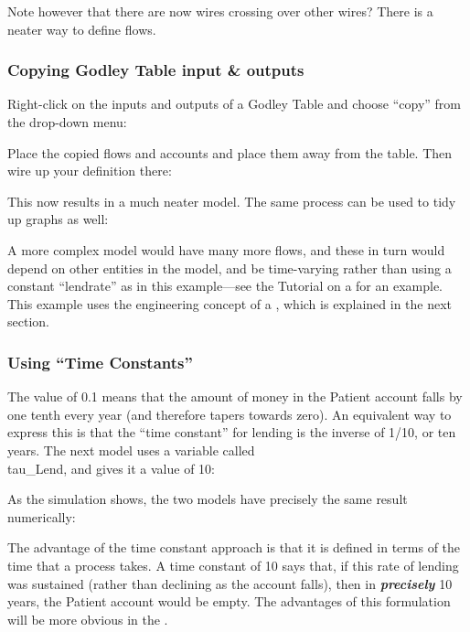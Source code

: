 Note however that there are now wires crossing over other wires? There
is a neater way to define flows. 

\subsubsection{Copying Godley Table input \& outputs}

Right-click on the inputs and outputs of a Godley Table and choose
``copy'' from the drop-down menu:



Place the copied flows and accounts and place them away from the
table. Then wire up your definition there:



This now results in a much neater model. The same process can be used
to tidy up graphs as well:



A more complex model would have many more flows, and these in turn
would depend on other entities in the model, and be time-varying
rather than using a constant ``lendrate'' as in this example---see the
Tutorial on a  for an
example. This example uses the engineering concept of a
, which is explained in the
next section. 

\subsubsection{Using ``Time Constants''}
\label{time-constants}

The value of 0.1 means that the amount of money in the Patient account
falls by one tenth every year (and therefore tapers towards zero). An
equivalent way to express this is that the ``time constant'' for
lending is the inverse of 1/10, or ten years. The next model uses a
variable called \\tau\_Lend, and gives it a value of 10: 


As the simulation shows, the two models have precisely the same result
numerically:



The advantage of the time constant approach is that it is defined in
terms of the time that a process takes. A time constant of 10 says
that, if this rate of lending was sustained (rather than declining as
the account falls), then in {\bf\em precisely} 10 years, the Patient account
would be empty. The advantages of this formulation will be more
obvious in the .


